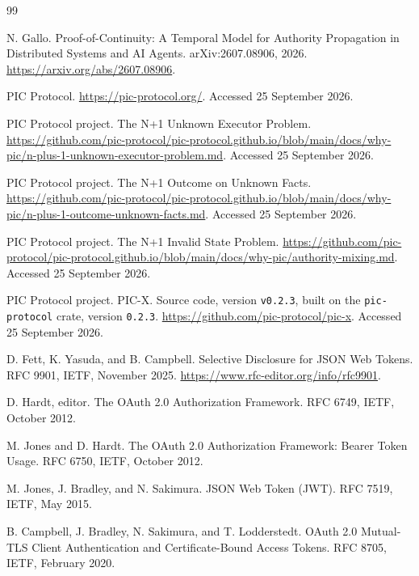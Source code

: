 \documentclass[10pt,twocolumn]{article}
\begin{document}
\begin{thebibliography}{99}

N. Gallo.
\newblock Proof-of-Continuity: A Temporal Model for Authority Propagation in
Distributed Systems and AI Agents.
\newblock arXiv:2607.08906, 2026. \url{https://arxiv.org/abs/2607.08906}.

PIC Protocol.
\newblock \url{https://pic-protocol.org/}.
\newblock Accessed 25 September 2026.

PIC Protocol project.
\newblock The N+1 Unknown Executor Problem.
\newblock
\url{https://github.com/pic-protocol/pic-protocol.github.io/blob/main/docs/why-pic/n-plus-1-unknown-executor-problem.md}.
\newblock Accessed 25 September 2026.

PIC Protocol project.
\newblock The N+1 Outcome on Unknown Facts.
\newblock
\url{https://github.com/pic-protocol/pic-protocol.github.io/blob/main/docs/why-pic/n-plus-1-outcome-unknown-facts.md}.
\newblock Accessed 25 September 2026.

PIC Protocol project.
\newblock The N+1 Invalid State Problem.
\newblock
\url{https://github.com/pic-protocol/pic-protocol.github.io/blob/main/docs/why-pic/authority-mixing.md}.
\newblock Accessed 25 September 2026.

PIC Protocol project.
\newblock PIC-X.
\newblock Source code, version \texttt{v0.2.3}, built
on the \texttt{pic-protocol} crate, version \texttt{0.2.3}.
\newblock \url{https://github.com/pic-protocol/pic-x}.
\newblock Accessed 25 September 2026.

D. Fett, K. Yasuda, and B. Campbell.
\newblock Selective Disclosure for JSON Web Tokens.
\newblock RFC 9901, IETF, November 2025.
\newblock \url{https://www.rfc-editor.org/info/rfc9901}.

D. Hardt, editor.
\newblock The OAuth 2.0 Authorization Framework.
\newblock RFC 6749, IETF, October 2012.

M. Jones and D. Hardt.
\newblock The OAuth 2.0 Authorization Framework: Bearer Token Usage.
\newblock RFC 6750, IETF, October 2012.

M. Jones, J. Bradley, and N. Sakimura.
\newblock JSON Web Token (JWT).
\newblock RFC 7519, IETF, May 2015.

B. Campbell, J. Bradley, N. Sakimura, and T. Lodderstedt.
\newblock OAuth 2.0 Mutual-TLS Client Authentication and Certificate-Bound
Access Tokens.
\newblock RFC 8705, IETF, February 2020.


\end{thebibliography}
\end{document}
